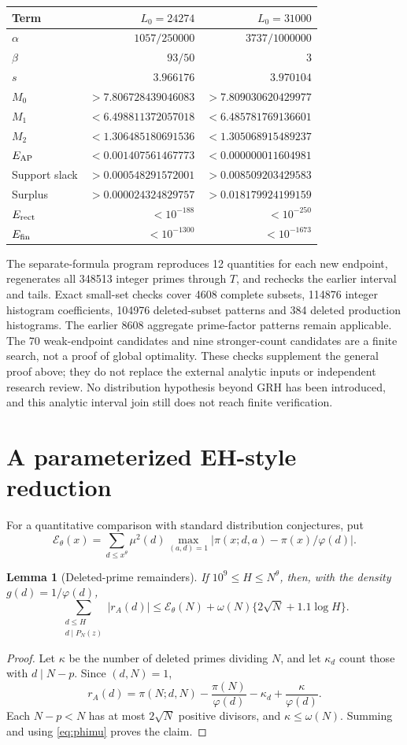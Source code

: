 \documentclass[11pt]{article}
\newtheorem{lemma}[theorem]{Lemma}
\newcommand{\om}{\omega}
\begin{document}
\begin{center}
\begin{tabular}{lrr}\toprule
Term & $L_0=24274$ & $L_0=31000$\\\midrule
$\alpha$ & $1057/250000$ & $3737/1000000$\\
$\beta$ & $93/50$ & $3$\\
$s$ & $3.966176$ & $3.970104$\\
$M_0$ & $>7.806728439046083$ & $>7.809030620429977$\\
$M_1$ & $<6.498811372057018$ & $<6.485781769136601$\\
$M_2$ & $<1.306485180691536$ & $<1.305068915489237$\\
$E_{\rm AP}$ & $<0.001407561467773$ & $<0.000000011604981$\\
Support slack & $>0.000548291572001$ & $>0.008509203429583$\\
Surplus & $>0.000024324829757$ & $>0.018179924199159$\\
$E_{\rm rect}$ & $<10^{-188}$ & $<10^{-250}$\\
$E_{\rm fin}$ & $<10^{-1300}$ & $<10^{-1673}$\\\bottomrule
\end{tabular}
\end{center}
The separate-formula program reproduces 12 quantities for each new
endpoint, regenerates all 348513 integer primes through $T$, and
rechecks the earlier interval and tails. Exact small-set checks cover
4608 complete subsets, 114876 integer histogram coefficients,
104976 deleted-subset patterns and 384 deleted production histograms.
The earlier 8608 aggregate prime-factor patterns remain applicable.
The 70 weak-endpoint candidates and nine stronger-count
candidates are a finite search, not a proof of global optimality.
These checks supplement the general proof above; they do not replace
the external analytic inputs or independent research review.
No distribution hypothesis beyond GRH has been introduced, and this
analytic interval join still does not reach finite verification.
\section{A parameterized EH-style reduction}
For a quantitative comparison with standard distribution conjectures,
put
\[
\mathcal E_\theta(x)=\sum_{d\le x^\theta}\mu^2(d)
\max_{(a,d)=1}|\pi(x;d,a)-\pi(x)/\varphi(d)|.
\]
\begin{lemma}[Deleted-prime remainders]\label{lem:deleted}
If $10^9\le H\le N^\theta$, then, with the density $g(d)=1/\varphi(d)$,
\[
\sum_{\substack{d\le H\\d\mid P_N(z)}}|r_A(d)|
\le\mathcal E_\theta(N)+\om(N)\{2\sqrt N+1.1\log H\}.
\]
\end{lemma}
\begin{proof}
Let $\kappa$ be the number of deleted primes dividing $N$, and let
$\kappa_d$ count those with $d\mid N-p$. Since $(d,N)=1$,
\[
r_A(d)=\pi(N;d,N)-\frac{\pi(N)}{\varphi(d)}
-\kappa_d+\frac{\kappa}{\varphi(d)}.
\]
Each $N-p<N$ has at most $2\sqrt N$ positive divisors, and
$\kappa\le\om(N)$. Summing and using \eqref{eq:phimu} proves the claim.
\end{proof}
\end{document}
